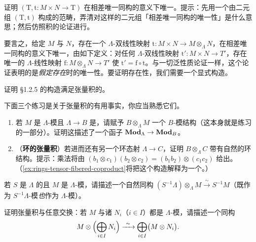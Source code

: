 \begin{exercise}\label{ex:tensor-pair-unique-isomorphism}
证明 $(\mathrm{T},\mathrm{t}\colon M\times N\to\mathrm{T})$ 在相差唯一同构的意义下唯一。提示：先用一个由二元组 $(\mathrm{T},\mathrm{t})$ 构成的范畴，弄清对这样的二元组「相差唯一同构的唯一性」是什么意思；然后仿照积的论证进行。
\end{exercise}

要言之，给定 $M$ 与 $N$，存在一个 $\Lambda$-双线性映射 $\mathrm{t}\colon M\times N\to M\otimes_\Lambda N$，在相差唯一同构的意义下唯一，由如下\trUniversalProperty{}定义：对任何 $\Lambda$-双线性映射 $\mathrm{t}'\colon M\times N\to T'$，存在唯一的 $\Lambda$-线性映射 $\mathrm{f}\colon M\otimes_\Lambda N\to T'$ 使 $\mathrm{t}'=\mathrm{f}\circ\mathrm{t}$。与一切泛性质论证一样，这个论证表明的是\emph{假定存在}时的唯一性。要证明存在性，我们需要一个显式构造。

\begin{exercise}\label{ex:tensor-construction-universal-property}
证明 \S1.2.5 的构造满足张量积的\trUniversalProperty。
\end{exercise}

下面三个练习是关于张量积的有用事实，你应当熟悉它们。

\begin{exercise}[重要练习]\label{ex:scalar-extension-tensor-of-rings}
\begin{enumerate}[label=(\alph*)]
\item 若 $M$ 是 $\Lambda$-模且 $\Lambda\to B$ 是\trRingMorphism，请赋予 $B\otimes_\Lambda M$ 一个 $B$-模结构（这本身就是练习的一部分）。证明这描述了一个函子 $\mathbf{Mod}_{\Lambda}\to\mathbf{Mod}_{B}$。
\item （\textbf{环的张量积}）若进而还有另一个环态射 $\Lambda\to C$，证明 $B\otimes_\Lambda C$ 带有自然的环结构。提示：乘法将由 $(b_1\otimes c_1)(b_2\otimes c_2)=(b_1b_2)\otimes(c_1c_2)$ 给出。（\cref{ex:rings-tensor-fibered-coproduct}将把这个构造解释为一个\trFiberedCoproduct。）
\end{enumerate}
\end{exercise}

\begin{exercise}[重要练习]\label{ex:tensored-localization-natural-isomorphism}
若 $S$ 是 $\Lambda$ 的\trMultiplicativeSubset{}且 $M$ 是 $\Lambda$-模，请描述一个自然同构 $(S^{-1}\Lambda)\otimes_\Lambda M\xrightarrow{\ \sim\ }S^{-1}M$（既作为 $S^{-1}\Lambda$-模\emph{也}作为 $\Lambda$-模）。
\end{exercise}

\begin{exercise}\label{ex:tensor-commutes-direct-sums}
证明张量积与任意\trDirectSum{}交换：若 $M$ 与诸 $N_i$（$i\in I$）都是 $\Lambda$-模，请描述一个同构
\[
M\otimes\Bigl(\bigoplus_{i\in I}N_i\Bigr)\xrightarrow{\ \sim\ }\bigoplus_{i\in I}\bigl(M\otimes N_i\bigr).
\]
\end{exercise}

